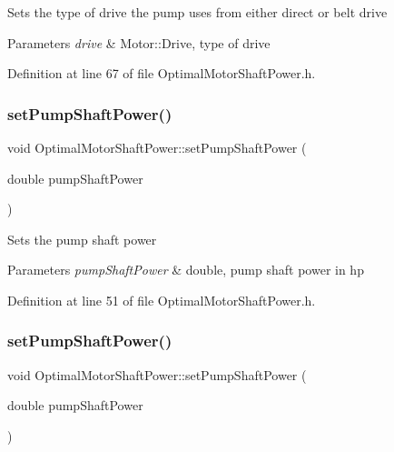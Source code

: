 Sets the type of drive the pump uses from either direct or belt drive 
\begin{DoxyParams}{Parameters}
{\em drive} & Motor\+::\+Drive, type of drive \\
\hline
\end{DoxyParams}


Definition at line 67 of file Optimal\+Motor\+Shaft\+Power.\+h.

\mbox{\label{class_optimal_motor_shaft_power_ab2d80927fbaa62705359700b2a8f2f26}} 
\subsubsection{\texorpdfstring{set\+Pump\+Shaft\+Power()}{setPumpShaftPower()}\hspace{0.1cm}{\footnotesize\ttfamily [1/3]}}
{\footnotesize\ttfamily void Optimal\+Motor\+Shaft\+Power\+::set\+Pump\+Shaft\+Power (\begin{DoxyParamCaption}\item[{double}]{pump\+Shaft\+Power }\end{DoxyParamCaption})\hspace{0.3cm}{\ttfamily [inline]}}

Sets the pump shaft power 
\begin{DoxyParams}{Parameters}
{\em pump\+Shaft\+Power} & double, pump shaft power in hp \\
\hline
\end{DoxyParams}


Definition at line 51 of file Optimal\+Motor\+Shaft\+Power.\+h.

\mbox{\label{class_optimal_motor_shaft_power_ab2d80927fbaa62705359700b2a8f2f26}} 
\subsubsection{\texorpdfstring{set\+Pump\+Shaft\+Power()}{setPumpShaftPower()}\hspace{0.1cm}{\footnotesize\ttfamily [2/3]}}
{\footnotesize\ttfamily void Optimal\+Motor\+Shaft\+Power\+::set\+Pump\+Shaft\+Power (\begin{DoxyParamCaption}\item[{double}]{pump\+Shaft\+Power }\end{DoxyParamCaption})\hspace{0.3cm}{\ttfamily [inline]}}

